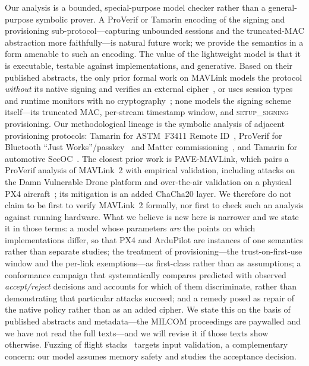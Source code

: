 \documentclass[conference]{IEEEtran}
\begin{document}
Our analysis is a bounded, special-purpose model checker rather than a
general-purpose symbolic prover. A ProVerif or Tamarin encoding of the signing
and provisioning sub-protocol---capturing unbounded sessions and the truncated-MAC
abstraction more faithfully---is natural future work; we provide the semantics in
a form amenable to such an encoding. The value of the lightweight model is that it
is executable, testable against implementations, and generative. Based on their published abstracts, the only prior formal work on MAVLink models
the protocol \emph{without} its native signing and verifies an external
cipher~\cite{wray2025pave,mak2025evtol},
or uses session types and runtime monitors with no
cryptography~\cite{amorim2025datum,amorim2026platum}; none models the signing
scheme itself---its truncated MAC, per-stream timestamp window, and
\textsc{setup\_signing} provisioning. Our methodological lineage is the symbolic
analysis of adjacent provisioning protocols: Tamarin for ASTM~F3411 Remote
ID~\cite{alam2026remoteid}, ProVerif for Bluetooth ``Just
Works''/passkey~\cite{wu2022bluetooth,jangid2023passkey} and Matter
commissioning~\cite{duttagupta2025matter}, and Tamarin for automotive
SecOC~\cite{bodei2024autosar}. The closest prior work is PAVE-MAVLink, which pairs
a ProVerif analysis of MAVLink~2 with empirical validation, including attacks on
the Damn Vulnerable Drone platform and over-the-air validation on a physical PX4
aircraft~\cite{wray2025pave,wray2025pavedemo}; its mitigation is an added
ChaCha20 layer. We therefore do not claim to be first to verify MAVLink~2
formally, nor first to check such an analysis against running hardware. What we
believe is new here is narrower and we state it in those terms: a model whose
parameters \emph{are} the points on which implementations differ, so that PX4 and
ArduPilot are instances of one semantics rather than separate studies; the
treatment of provisioning---the trust-on-first-use window and the per-link
exemptions---as first-class rather than as assumptions; a conformance campaign
that systematically compares predicted with observed \emph{accept/reject}
decisions and accounts for which of them discriminate, rather than demonstrating
that particular attacks succeed; and a remedy posed as repair of the native
policy rather than as an added cipher. We state this on the basis of published
abstracts and metadata---the MILCOM proceedings are paywalled and we have not
read the full texts---and we will revise it if those texts show otherwise.
Fuzzing of flight stacks~\cite{kim2019rvfuzzer,kim2021pgfuzz} targets input
validation, a complementary concern: our model assumes memory safety and studies
the acceptance decision.
\end{document}
